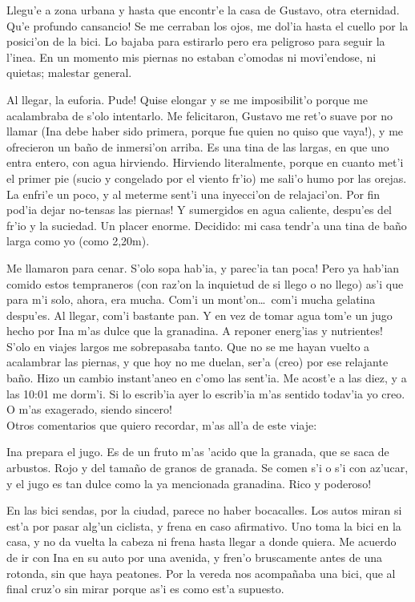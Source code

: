 Llegu'e a zona urbana y hasta que encontr'e la casa de Gustavo, otra eternidad.
\textexclamdown Qu'e profundo cansancio! Se me cerraban los ojos, me dol'ia
hasta el cuello por la posici'on de la bici. Lo bajaba para estirarlo pero era
peligroso para seguir la l'inea. En un momento mis piernas no estaban c'omodas
ni movi'endose, ni quietas; malestar general.

Al llegar, la euforia. \textexclamdown Pude! Quise elongar y se me imposibilit'o
porque me acalambraba de s'olo intentarlo. Me felicitaron, Gustavo me ret'o
suave por no llamar (\textexclamdown Ina debe haber sido primera, porque fue
quien no quiso que vaya!), y me ofrecieron un ba\~no de inmersi'on arriba. Es
una tina de las largas, en que uno entra entero, con agua hirviendo. Hirviendo
literalmente, porque en cuanto met'i el primer pie (sucio y congelado por el
viento fr'io) me sali'o humo por las orejas. La enfri'e un poco, y al meterme
sent'i una inyecci'on de relajaci'on. \textexclamdown Por fin pod'ia dejar
no-tensas las piernas! Y sumergidos en agua caliente, despu'es del fr'io y la
suciedad. Un placer enorme. Decidido: mi casa tendr'a una tina de ba\~no larga
como yo (como 2,20m).

Me llamaron para cenar. S'olo sopa hab'ia, \textexclamdown y parec'ia tan poca!
Pero ya hab'ian comido estos tempraneros (con raz'on la inquietud de si llego o
no llego) as'i que para m'i solo, ahora, era mucha. Com'i un mont'on\ldots\
com'i mucha gelatina despu'es. Al llegar, com'i bastante pan. Y en vez de tomar
agua tom'e un jugo hecho por Ina m'as dulce que la granadina. \textexclamdown A
reponer energ'ias y nutrientes! S'olo en viajes largos me sobrepasaba tanto. Que
no se me hayan vuelto a acalambrar las piernas, y que hoy no me duelan, ser'a
(creo) por ese relajante ba\~no. Hizo un cambio instant'aneo en c'omo las
sent'ia. Me acost'e a las diez, y a las 10:01 me dorm'i. Si lo escrib'ia ayer lo
escrib'ia m'as sentido todav'ia yo creo. \textexclamdown O m'as exagerado,
siendo sincero!\\

Otros comentarios que quiero recordar, m'as all'a de este viaje:

Ina prepara el jugo. Es de un fruto m'as 'acido que la granada, que se saca de
arbustos. Rojo y del tama\~no de granos de granada. Se comen s'i o s'i con
az'ucar, y el jugo es tan dulce como la ya mencionada granadina. \textexclamdown
Rico y poderoso!

En las bici sendas, por la ciudad, parece no haber bocacalles. Los autos miran
si est'a por pasar alg'un ciclista, y frena en caso afirmativo. Uno toma la bici
en la casa, y no da vuelta la cabeza ni frena hasta llegar a donde quiera. Me
acuerdo de ir con Ina en su auto por una avenida, y fren'o bruscamente antes de
una rotonda, sin que haya peatones. Por la vereda nos acompa\~naba una bici, que
al final cruz'o sin mirar porque as'i es como est'a supuesto.

